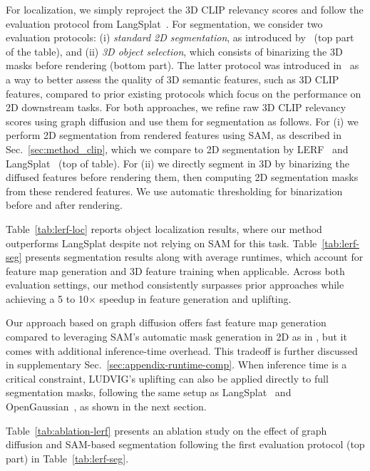 For localization, we simply reproject the 3D CLIP relevancy scores and follow the evaluation protocol from LangSplat~\citep{qin2023langsplat}. 
For segmentation, we consider two evaluation protocols:
(i) \textit{standard 2D segmentation}, as introduced by~\citep{kerr2023lerf} (top part of the table), and (ii) \emph{3D object selection}, which consists of binarizing the 3D masks before rendering (bottom part). The latter protocol was introduced in~\citep{jun2025drsplat} as a way to better assess the quality of 3D semantic features, such as 3D CLIP features, compared to prior existing protocols which focus on the performance on 2D downstream tasks.
For both approaches, we refine raw 3D CLIP relevancy scores using graph diffusion and use them for segmentation as follows. For
(i) we perform 2D segmentation from rendered features using SAM, as described in Sec.~\ref{sec:method_clip}, which we compare to 2D segmentation by LERF~\citep{kerr2023lerf} and LangSplat~\citep{qin2023langsplat} (top of table).
For (ii) we directly segment in 3D by binarizing the diffused features before rendering them, then computing 2D segmentation masks from these rendered features. We use automatic thresholding for binarization before and after rendering. 

Table~\ref{tab:lerf-loc} reports object localization results, where our method outperforms LangSplat despite not relying on SAM for this task.
Table~\ref{tab:lerf-seg} presents segmentation results along with average runtimes, which account for feature map generation and 3D feature training when applicable.
Across both evaluation settings, our method consistently surpasses prior approaches while achieving a 5 to 10$\times$ speedup in feature generation and uplifting.

Our approach based on graph diffusion offers fast feature map generation compared to leveraging SAM’s automatic mask generation in 2D as in \citep{qin2023langsplat,wu2024opengaussian}, but it comes with additional inference-time overhead. This tradeoff is further discussed in supplementary Sec.~\ref{sec:appendix-runtime-comp}. When inference time is a critical constraint, LUDVIG’s uplifting can also be applied directly to full segmentation masks, following the same setup as LangSplat~\citep{qin2023langsplat} and OpenGaussian~\citep{wu2024opengaussian}, as shown in the next section.



%
Table~\ref{tab:ablation-lerf} presents an ablation study on the effect of graph diffusion and SAM-based segmentation following the first evaluation protocol (top part) in Table~\ref{tab:lerf-seg}. 

